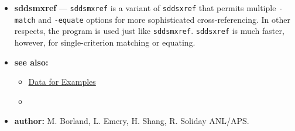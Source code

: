 \begin{itemize}
\item {\bf sddsmxref} --- {\tt sddsmxref} is a variant of {\tt sddsxref} that permits multiple {\tt -match}
and {\tt -equate} options for more sophisticated cross-referencing.  In other respects, the program is
used just like {\tt sddsmxref}.  {\tt sddsxref} is much faster, however, for single-criterion matching or
equating.
\item {\bf see also:}
    \begin{itemize}
    \item \hyperref[exampleData]{Data for Examples}
    \item {}
    \end{itemize}
\item {\bf author:} M. Borland, L. Emery, H. Shang, R. Soliday ANL/APS.
\end{itemize}

